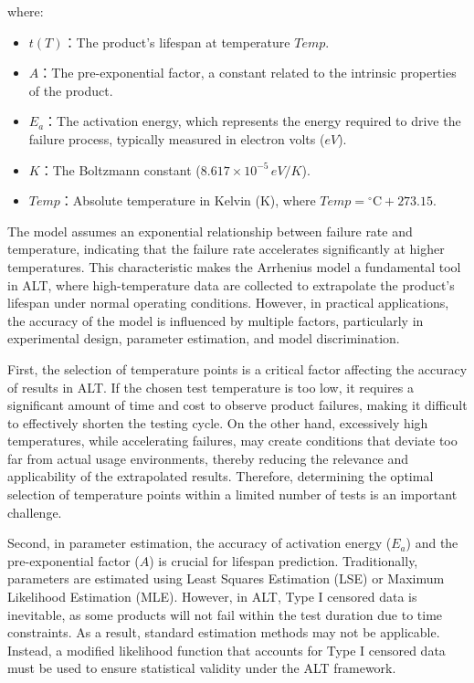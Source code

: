where: 
\begin{itemize}
\item $t(T)$：The product's lifespan at temperature $Temp$. 
\item $A$：The pre-exponential factor, a constant related to the intrinsic properties of the product.

\item $E_a$：The activation energy, which represents the energy required to drive the failure process, typically measured in electron volts ($eV$).

\item $K$：The Boltzmann constant ($8.617 \times 10^{-5} \, eV/K$).
\item $Temp$：Absolute temperature in Kelvin (K), where  $Temp=$$^\circ\text{C}+273.15$.
\end{itemize}

\hspace*{8mm} The model assumes an exponential relationship between failure rate and temperature, indicating that the failure rate accelerates significantly at higher temperatures. This characteristic makes the Arrhenius model a fundamental tool in ALT, where high-temperature data are collected to extrapolate the product's lifespan under normal operating conditions. However, in practical applications, the accuracy of the model is influenced by multiple factors, particularly in experimental design, parameter estimation, and model discrimination.

\hspace*{8mm} First, the selection of temperature points is a critical factor affecting the accuracy of results in ALT. If the chosen test temperature is too low, it requires a significant amount of time and cost to observe product failures, making it difficult to effectively shorten the testing cycle. On the other hand, excessively high temperatures, while accelerating failures, may create conditions that deviate too far from actual usage environments, thereby reducing the relevance and applicability of the extrapolated results. Therefore, determining the optimal selection of temperature points within a limited number of tests is an important challenge.

\hspace*{8mm} Second, in parameter estimation, the accuracy of activation energy ($E_a$) and the pre-exponential factor ($A$) is crucial for lifespan prediction.  Traditionally, parameters are estimated using Least Squares Estimation (LSE) or Maximum Likelihood Estimation (MLE). However, in ALT, Type I censored data is inevitable, as some products will not fail within the test duration due to time constraints. As a result, standard estimation methods may not be applicable. Instead, a modified likelihood function that accounts for Type I censored data must be used to ensure statistical validity under the ALT framework.

